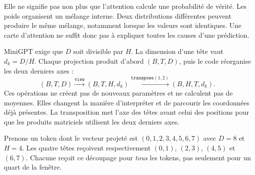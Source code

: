 Elle ne signifie pas non plus que l'attention calcule une probabilité de vérité. Les poids organisent un mélange interne. Deux distributions différentes peuvent produire le même mélange, notamment lorsque les valeurs sont identiques. Une carte d'attention ne suffit donc pas à expliquer toutes les causes d'une prédiction.






MiniGPT exige que $D$ soit divisible par $H$. La dimension d'une tête vaut $d_k=D/H$. Chaque projection produit d'abord $(B,T,D)$, puis le code réorganise les deux derniers axes :
\[
 (B,T,D)\xrightarrow{\texttt{view}}(B,T,H,d_k)
 \xrightarrow{\texttt{transpose}(1,2)}(B,H,T,d_k).
\]
Ces opérations ne créent pas de nouveaux paramètres et ne calculent pas de moyennes. Elles changent la manière d'interpréter et de parcourir les coordonnées déjà présentes. La transposition met l'axe des têtes avant celui des positions pour que les produits matriciels utilisent les deux derniers axes.

Prenons un token dont le vecteur projeté est $(0,1,2,3,4,5,6,7)$ avec $D=8$ et $H=4$. Les quatre têtes reçoivent respectivement $(0,1)$, $(2,3)$, $(4,5)$ et $(6,7)$. Chacune reçoit ce découpage pour \emph{tous} les tokens, pas seulement pour un quart de la fenêtre.

